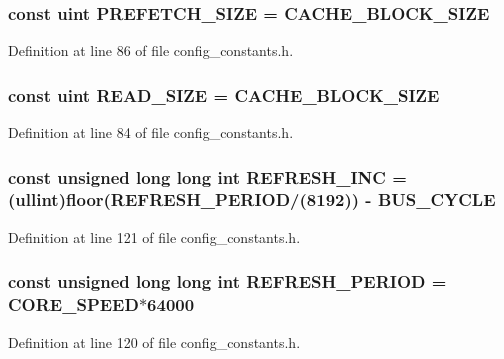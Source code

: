 \subsubsection[{PREFETCH\_\-SIZE}]{\setlength{\rightskip}{0pt plus 5cm}const {\bf uint} {\bf PREFETCH\_\-SIZE} = {\bf CACHE\_\-BLOCK\_\-SIZE}}\label{config__constants_8h_624d7e625d99d2ac11d8e8f96075cfa3}




Definition at line 86 of file config\_\-constants.h.
\subsubsection[{READ\_\-SIZE}]{\setlength{\rightskip}{0pt plus 5cm}const {\bf uint} {\bf READ\_\-SIZE} = {\bf CACHE\_\-BLOCK\_\-SIZE}}\label{config__constants_8h_d114b4c812fd5e350f6af789584aab23}




Definition at line 84 of file config\_\-constants.h.
\subsubsection[{REFRESH\_\-INC}]{\setlength{\rightskip}{0pt plus 5cm}const unsigned long long int {\bf REFRESH\_\-INC} = ({\bf ullint})floor({\bf REFRESH\_\-PERIOD}/(8192)) - {\bf BUS\_\-CYCLE}}\label{config__constants_8h_9a745bfbe702d815996ac96a955c5ef7}




Definition at line 121 of file config\_\-constants.h.
\subsubsection[{REFRESH\_\-PERIOD}]{\setlength{\rightskip}{0pt plus 5cm}const unsigned long long int {\bf REFRESH\_\-PERIOD} = {\bf CORE\_\-SPEED}$\ast$64000}\label{config__constants_8h_d18776c43e1bb0d2434a1a1d217d1523}




Definition at line 120 of file config\_\-constants.h.
